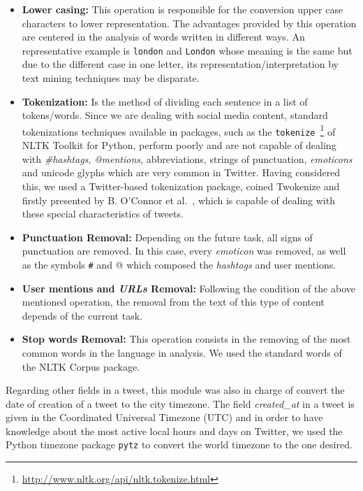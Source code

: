 \begin{itemize}
	\item \textbf{Lower casing:} This operation is responsible for the conversion upper case characters to lower representation. The advantages provided by this operation are centered in the analysis of words written in different ways. An representative example is \texttt{london} and \texttt{London} whose meaning is the same but due to the different case in one letter, its representation/interpretation by text mining techniques may be disparate.
	\item \textbf{Tokenization:} Is the method of dividing each sentence in a list of tokens/words. Since we are dealing with social media content, standard tokenizations techniques available in packages, such as the \texttt{tokenize}~\footnote{\url{http://www.nltk.org/api/nltk.tokenize.html}} of NLTK Toolkit for Python, perform poorly and are not capable of dealing with \textit{\#hashtags}, \textit{@mentions}, abbreviations, strings of punctuation, \textit{emoticons} and unicode glyphs which are very common in Twitter. Having considered this, we used a Twitter-based tokenization package, coined Twokenize and firstly presented by B. O'Connor et al.~\cite{o2010tweetmotif}, which is capable of dealing with these special characteristics of tweets.
	\item \textbf{Punctuation Removal:} Depending on the future task, all signs of punctuation are removed. In this case, every \textit{emoticon} was removed, as well as the symbols \texttt{\#} and {@} which composed the \textit{hashtags} and user mentions.
	\item \textbf{User mentions and \textit{URLs} Removal:} Following the condition of the above mentioned operation, the removal from the text of this type of content depends of the current task.
	\item \textbf{Stop words Removal:} This operation consists in the removing of the most common words in the language in analysis. We used the standard words of the NLTK Corpus package.
\end{itemize}

Regarding other fields in a tweet, this module was also in charge of convert the date of creation of a tweet to the city timezone. The field \textit{created\_at} in a tweet is given in the Coordinated Universal Timezone (UTC) and in order to have knowledge about the most active local hours and days on Twitter, we used the Python timezone package \texttt{pytz} to convert the world timezone to the one desired.

